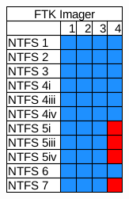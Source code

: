 \begin{figure}
\begin{subfigure}{0.16\linewidth}
        \includegraphics[width=\linewidth]{fig/ftk_results_ntfs.png}
    \end{subfigure}
    \begin{subfigure}{0.16\linewidth}

\end{subfigure}
\end{figure}
